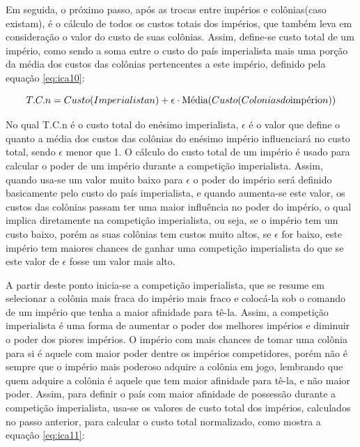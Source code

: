 Em seguida, o próximo passo, após as trocas entre impérios e colônias(caso existam), é o cálculo de todos os custos totais dos impérios, que também leva em consideração o valor do custo de suas colônias. Assim, define-se custo total de um império, como sendo a soma entre o custo do país imperialista mais uma porção da média dos custos das colônias pertencentes a este império, definido pela equação \ref{eq:ica10}:

\begin{equation}
\label{eq:ica10}
T.C.n =   Custo(Imperialista n) + \\
 \epsilon \cdot \text{Média}(Custo(Colonias do \text{império} n))
\end{equation}

No qual T.C.n é o custo total do enésimo imperialista, \(\epsilon\)  é o valor que define o quanto a média dos custos das colônias do enésimo império influenciará no custo total, sendo \(\epsilon\) menor que 1. O cálculo do custo total de um império é usado para calcular o poder de um império durante a competição imperialista. Assim, quando usa-se um valor muito baixo para \(\epsilon\) o poder do império será definido basicamente pelo custo do país imperialista, e quando aumenta-se este valor, os custos das colônias passam ter uma maior influência no poder do império, o qual implica diretamente na competição imperialista, ou seja, se o império tem um custo baixo, porém as suas colônias tem custos muito altos, se \(\epsilon\) for baixo, este império tem maiores chances de ganhar uma competição imperialista do que se este valor de \(\epsilon\) fosse um valor mais alto.

A partir deste ponto inicia-se a competição imperialista, que se resume em selecionar a colônia mais fraca do império mais fraco e colocá-la sob o comando de um império que tenha a maior afinidade para tê-la. Assim, a competição imperialista é uma forma de aumentar o poder dos melhores impérios e diminuir o poder dos piores impérios. O império com mais chances de tomar uma colônia para si é aquele com maior poder dentre os impérios competidores, porém não é sempre que o império mais poderoso adquire a colônia em jogo, lembrando que quem adquire a colônia é aquele que tem maior afinidade para tê-la, e não maior poder. Assim, para definir o país com maior afinidade de possessão durante a competição imperialista, usa-se os valores de custo total dos impérios, calculados no passo anterior, para calcular o custo total normalizado, como mostra a equação \ref{eq:ica11}:

